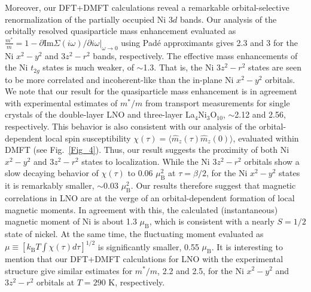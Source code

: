 \documentclass[prl,twocolumn,preprintnumbers,superscriptaddress]{revtex4-1}
\begin{document}
Moreover, our DFT+DMFT calculations reveal a remarkable orbital-selective renormalization of the partially occupied Ni $3d$ bands. Our analysis of the orbitally resolved quasiparticle mass enhancement evaluated 
as $\frac{m^*}{m} = 1 - \partial \mathrm{Im}\Sigma(i\omega)/ \partial i\omega |_{\omega\rightarrow 0}$ using Pad\'e approximants gives 2.3 and 3 for the Ni $x^2-y^2$ and $3z^2-r^2$ bands, respectively. The effective mass enhancements of the 
Ni $t_{2g}$ states is much weaker, of $\sim$1.3. That is, the Ni $3z^2-r^2$ states are seen to be more correlated and incoherent-like than the in-plane Ni $x^2-y^2$ orbitals. We note that our result for the quasiparticle 
mass enhancement is in agreement with experimental estimates of $m^*/m$  from transport measurements for single crystals of the double-layer LNO and 
three-layer La$_4$Ni$_3$O$_{10}$, $\sim$2.12 and 2.56, respectively. This behavior is also consistent with our analysis of the orbital-dependent local spin susceptibility 
$\chi(\tau) = \langle \hat{m}_z(\tau) \hat{m}_z(0) \rangle$, evaluated within DMFT (see Fig.~\ref{Fig_4}). Thus, our result suggests the proximity of both Ni $x^2-y^2$ and $3z^2-r^2$ states to localization. While 
the Ni $3z^2-r^2$ orbitals show a slow decaying behavior of $\chi(\tau)$ to 0.06 $\mu_\mathrm{B}^2$ at $\tau=\beta/2$, for the Ni $x^2-y^2$ states it is remarkably smaller, $\sim$0.03 $\mu_\mathrm{B}^2$. Our results therefore suggest 
that magnetic correlations in LNO are at the verge of an orbital-dependent formation of local magnetic moments. In agreement with this, the calculated (instantaneous) magnetic moment of Ni is about 
1.3 $\mu_\mathrm{B}$, which is consistent with a nearly $S = 1/2$ state of nickel. At the same time, the fluctuating moment evaluated as $\mu \equiv [k_\mathrm{B}T \int \chi(\tau) d\tau]^{1/2}$ is significantly smaller, 0.55 $\mu_\mathrm{B}$. It is interesting to mention that our DFT+DMFT calculations for LNO with the experimental structure give similar estimates for $m^*/m$, 2.2 and 2.5, 
for the Ni $x^2-y^2$ and $3z^2-r^2$ orbitals at $T=290$ K, respectively.
\end{document}
